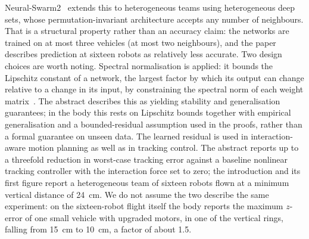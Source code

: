Neural-Swarm2~\cite{shi2022neuralswarm2} extends this to heterogeneous teams using heterogeneous
deep sets, whose permutation-invariant architecture accepts any number of neighbours. That is a
structural property rather than an accuracy claim: the networks are trained on at most three
vehicles (at most two neighbours), and the paper describes prediction at sixteen robots as
relatively less accurate. Two design choices are worth noting. Spectral normalisation is applied:
it bounds the Lipschitz constant of a network, the largest factor by which its output can change
relative to a change in its input, by constraining the spectral norm of each weight
matrix~\cite{shi2020neuralswarm}. The abstract describes this as yielding stability and generalisation
guarantees; in the body this
rests on Lipschitz bounds together with empirical generalisation and a bounded-residual assumption
used in the proofs, rather than a formal guarantee on unseen data. The learned residual is used in
interaction-aware motion planning as well as in tracking control. The abstract reports up to a
threefold reduction in worst-case tracking error against a baseline nonlinear tracking controller
with the interaction force set to zero; the introduction and its first figure report a
heterogeneous team of sixteen robots flown at a minimum vertical distance of
\SI{24}{\centi\metre}. We do not assume the two describe the same experiment: on the sixteen-robot
flight itself the body reports the maximum \(z\)-error of one small vehicle with upgraded motors,
in one of the vertical rings, falling from \SI{15}{\centi\metre} to \SI{10}{\centi\metre}, a factor
of about \num{1.5}.

